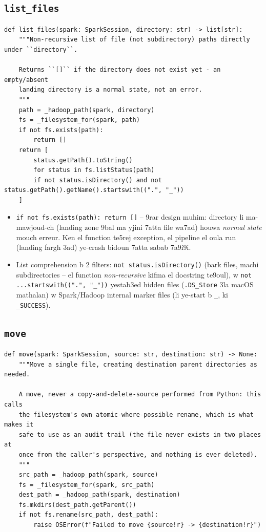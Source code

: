 \documentclass[11pt,a4paper]{report}
\DeclareRobustCommand{\code}[1]{\texttt{#1}}
\begin{document}
\subsection{\code{list\_files}}

\begin{lstlisting}[style=pystyle]
def list_files(spark: SparkSession, directory: str) -> list[str]:
    """Non-recursive list of file (not subdirectory) paths directly under ``directory``.

    Returns ``[]`` if the directory does not exist yet - an empty/absent
    landing directory is a normal state, not an error.
    """
    path = _hadoop_path(spark, directory)
    fs = _filesystem_for(spark, path)
    if not fs.exists(path):
        return []
    return [
        status.getPath().toString()
        for status in fs.listStatus(path)
        if not status.isDirectory() and not status.getPath().getName().startswith((".", "_"))
    ]
\end{lstlisting}

\begin{itemize}
  \item \code{if not fs.exists(path): return []} -- 9rar design muhim: directory
        li ma-mawjoud-ch (landing zone 9bal ma yjini 7atta file wa7ad) houwa
        \emph{normal state} mouch erreur. Ken el function te5rej exception,
        el pipeline el oula run (landing fargh 3ad) ye-crash bidoun 7atta
        sabab 7a9i9i.
  \item List comprehension b 2 filters: \code{not status.isDirectory()}
        (bark files, machi subdirectories -- el function \emph{non-recursive}
        kifma el docstring te9oul), w \code{not ...startswith((".", "\_"))}
        yestab3ed hidden files (\code{.DS\_Store} 3la macOS mathalan) w
        Spark/Hadoop internal marker files (li ye-start b \code{\_}, ki
        \code{\_SUCCESS}).
\end{itemize}

\subsection{\code{move}}

\begin{lstlisting}[style=pystyle]
def move(spark: SparkSession, source: str, destination: str) -> None:
    """Move a single file, creating destination parent directories as needed.

    A move, never a copy-and-delete-source performed from Python: this calls
    the filesystem's own atomic-where-possible rename, which is what makes it
    safe to use as an audit trail (the file never exists in two places at
    once from the caller's perspective, and nothing is ever deleted).
    """
    src_path = _hadoop_path(spark, source)
    fs = _filesystem_for(spark, src_path)
    dest_path = _hadoop_path(spark, destination)
    fs.mkdirs(dest_path.getParent())
    if not fs.rename(src_path, dest_path):
        raise OSError(f"Failed to move {source!r} -> {destination!r}")
\end{lstlisting}
\end{document}
